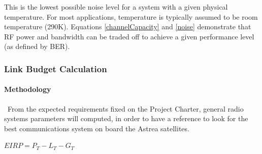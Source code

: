 This is the lowest possible noise level for a system with a given physical temperature. For most applications, temperature is typically assumed to be room temperature (290K). Equations \ref{channelCapacity} and \ref{noise} demonstrate that RF power and bandwidth can be traded off to achieve a given performance level (as defined by BER). \cite{Note1998}

\subsubsection{Link Budget Calculation}
\paragraph{Methodology} \ From the expected requirements fixed on the Project Charter, general radio systems parameters will computed, in order to have a reference to look for the best communications system on board the Astrea satellites.

$EIRP=P_T-L_T-G_T$
